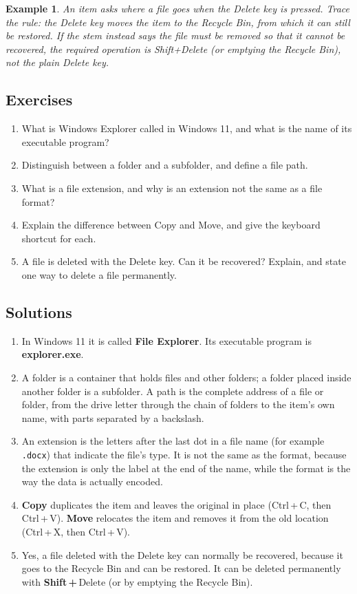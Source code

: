 \documentclass[11pt]{article}
\newtheorem{example}{Example}[section]
\begin{document}
\begin{example}
An item asks where a file goes when the Delete key is pressed. Trace the rule:
the Delete key moves the item to the Recycle Bin, from which it can still be
restored. If the stem instead says the file must be removed so that it cannot
be recovered, the required operation is Shift+Delete (or emptying the Recycle
Bin), not the plain Delete key.
\end{example}

\subsection*{Exercises}
\begin{enumerate}[label=\arabic*.]
  \item What is Windows Explorer called in Windows 11, and what is the name
    of its executable program?
  \item Distinguish between a folder and a subfolder, and define a file path.
  \item What is a file extension, and why is an extension not the same as a
    file format?
  \item Explain the difference between Copy and Move, and give the keyboard
    shortcut for each.
  \item A file is deleted with the Delete key. Can it be recovered? Explain,
    and state one way to delete a file permanently.
\end{enumerate}

\subsection*{Solutions}
\begingroup\small
\begin{enumerate}[label=\arabic*.]
  \item In Windows 11 it is called \textbf{File Explorer}. Its executable
    program is \textbf{explorer.exe}.
  \item A folder is a container that holds files and other folders; a folder
    placed inside another folder is a subfolder. A path is the complete
    address of a file or folder, from the drive letter through the chain of
    folders to the item's own name, with parts separated by a backslash.
  \item An extension is the letters after the last dot in a file name (for
    example \texttt{.docx}) that indicate the file's type. It is not the same
    as the format, because the extension is only the label at the end of the
    name, while the format is the way the data is actually encoded.
  \item \textbf{Copy} duplicates the item and leaves the original in place
    (Ctrl\,+\,C, then Ctrl\,+\,V). \textbf{Move} relocates the item and
    removes it from the old location (Ctrl\,+\,X, then Ctrl\,+\,V).
  \item Yes, a file deleted with the Delete key can normally be recovered,
    because it goes to the Recycle Bin and can be restored. It can be deleted
    permanently with \textbf{Shift\,+\,$\boxed{\text{Delete}}$} (or by
    emptying the Recycle Bin).
\end{enumerate}
\endgroup
\end{document}
